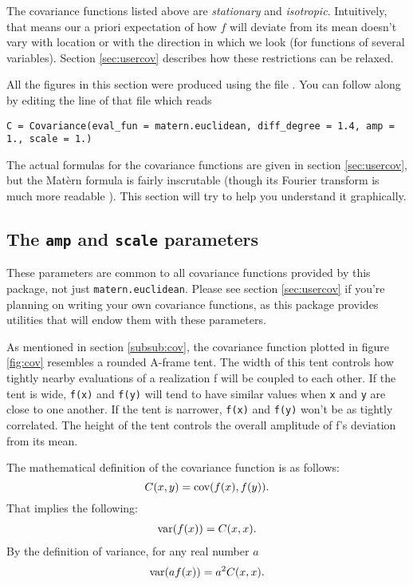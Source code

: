 \documentclass[]{manual}
\begin{document}
The covariance functions listed above are \emph{stationary} and \emph{isotropic}. Intuitively, that means our a priori expectation of how $f$ will deviate from its mean doesn't vary with location or with the direction in which we look (for functions of several variables). Section \ref{sec:usercov} describes how these restrictions can be relaxed.

All the figures in this section were produced using the file . You can follow along by editing the line of that file which reads
\begin{verbatim}
C = Covariance(eval_fun = matern.euclidean, diff_degree = 1.4, amp = 1., scale = 1.)
\end{verbatim}

The actual formulas for the covariance functions are given in section \ref{sec:usercov}, but the Mat\`ern formula is fairly inscrutable (though its Fourier transform is much more readable \cite{stein}). This section will try to help you understand it graphically.

\subsection*{The \texttt{amp} and \texttt{scale} parameters}\label{sub:ampscale}

These parameters are common to all covariance functions provided by this package, not just \texttt{matern.euclidean}. Please see section \ref{sec:usercov} if you're planning on writing your own covariance functions, as this package provides utilities that will endow them with these parameters.

As mentioned in section \ref{subsub:cov}, the covariance function plotted in figure \ref{fig:cov} resembles a rounded A-frame tent. The width of this tent controls how tightly nearby evaluations of a realization f will be coupled to each other. If the tent is wide, \texttt{f(x)} and \texttt{f(y)} will tend to have similar values when \texttt{x} and \texttt{y} are close to one another. If the tent is narrower, \texttt{f(x)} and \texttt{f(y)} won't be as tightly correlated. The height of the tent controls the overall amplitude of f's deviation from its mean.

The mathematical definition of the covariance function is as follows:
\begin{equation}
    \label{covdef}
    C(x,y)=\textup{cov}(f(x), f(y)).
\end{equation}
That implies the following:
\begin{eqnarray*}
    \textup{var}(f(x))=C(x,x).
\end{eqnarray*}
By the definition of variance, for any real number $a$
\begin{eqnarray*}
    \textup{var}( a f(x))=a^2 C(x,x).
\end{eqnarray*}
\end{document}
